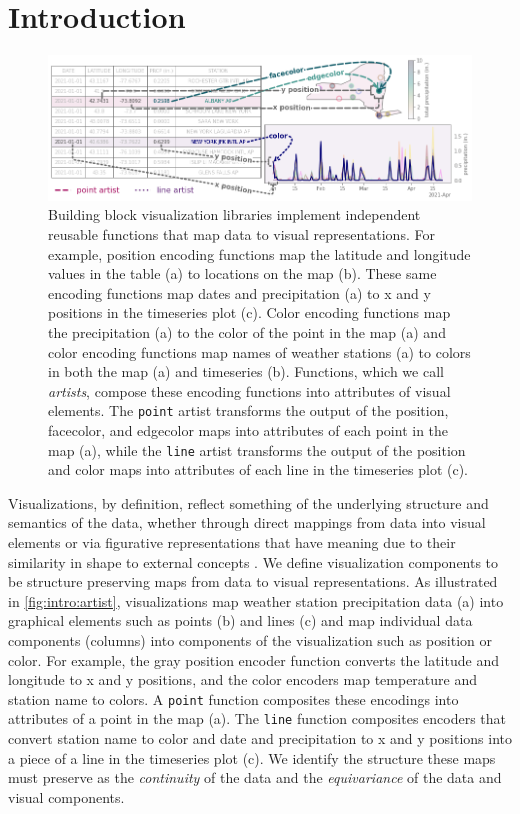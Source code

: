 \documentclass[../main.tex]{subfiles}
\begin{document}
\section{Introduction}
\label{sec:intro}
\begin{figure}[h]
    \includegraphics[width=1\textwidth]{figures/intro/functions.png}
    \caption{Building block visualization libraries implement independent reusable functions that map data to visual representations. For example, position encoding functions map the latitude and longitude values in the table (a) to locations on the map (b). These same encoding functions map dates and precipitation (a) to x and y positions in the timeseries plot (c). Color encoding functions map the precipitation (a) to the color of the point in the map (a) and color encoding functions map names of weather stations (a) to colors in both the map (a) and timeseries (b). Functions, which we call \textit{artists}, compose these encoding functions into attributes of visual elements. The \texttt{point} artist transforms the output of the position, facecolor, and edgecolor maps into attributes of each point in the map (a), while the \texttt{line} artist transforms the output of the position and color maps into attributes of each line in the timeseries plot (c).}
    \label{fig:intro:artist}
\end{figure}

Visualizations, by definition, reflect something of the underlying structure and semantics\cite{friendlyBriefHistoryData2008} of the data, whether through direct mappings from data into visual elements or via figurative representations that have meaning due to their similarity in shape to external concepts \cite{byrneAcquiredCodesMeaning2016}. We define visualization components to be structure preserving maps from data to visual representations. As illustrated in \autoref{fig:intro:artist}, visualizations map weather station precipitation data (a) into graphical elements such as points (b) and lines (c) and map individual data components (columns) into components of the visualization such as position or color. For example, the gray position encoder function converts the latitude and longitude to x and y positions, and the color encoders map temperature and station name to colors. A \texttt{point} function composites these encodings into attributes of a point in the map (a). The \texttt{line} function composites encoders that convert station name to color and date and precipitation to x and y positions into a piece of a line in the timeseries plot (c). We identify the structure these maps must preserve as the \textit{continuity} of the data and the \textit{equivariance} of the data and visual components. 
\end{document}

